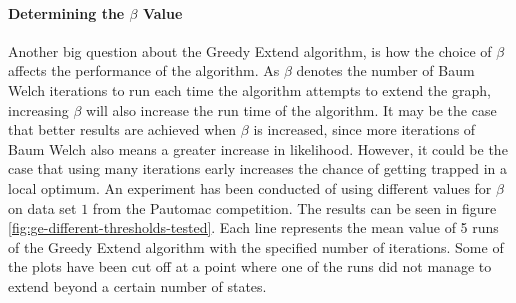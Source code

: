 \paragraph{Determining the $\beta$ Value}

Another big question about the Greedy Extend algorithm, is how the choice of $\beta$ affects the performance of the algorithm.
As $\beta$ denotes the number of Baum Welch iterations to run each time the algorithm attempts to extend the graph, increasing $\beta$ will also increase the run time of the algorithm. It may be the case that better results are achieved when $\beta$ is increased, since more iterations of Baum Welch also means a greater increase in likelihood. However, it could be the case that using many iterations early increases the chance of getting trapped in a local optimum.
An experiment has been conducted of using different values for $\beta$ on data set $1$ from the Pautomac competition. The results can be seen in figure \ref{fig:ge-different-thresholds-tested}. Each line represents the mean value of 5 runs of the Greedy Extend algorithm with the specified number of iterations. Some of the plots have been cut off at a point where one of the runs did not manage to extend beyond a certain number of states.

